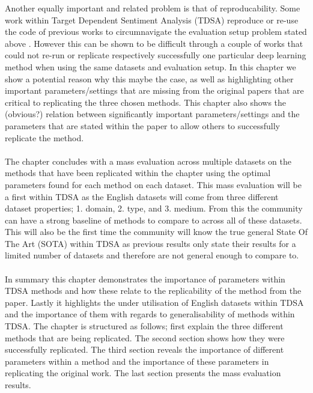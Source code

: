 Another equally important and related problem is that of reproducability. Some work within Target Dependent Sentiment Analysis (TDSA) reproduce or re-use the code of previous works to circumnavigate the evaluation setup problem stated above \citep{repro_chen_2017,repro_tay_2018}. However this can be shown to be difficult through a couple of works \citep{repro_chen_2017,repro_tay_2018} that could not re-run or replicate respectively successfully one particular deep learning method \citet{repro_tang_2016} when using the same datasets and evaluation setup. In this chapter we show a potential reason why this maybe the case, as well as highlighting other important parameters/settings that are missing from the original papers that are critical to replicating the three chosen methods. This chapter also shows the (obvious?) relation between significantly important parameters/settings and the parameters that are stated within the paper to allow others to successfully replicate the method.\\
\\
The chapter concludes with a mass evaluation across multiple datasets on the methods that have been replicated within the chapter using the optimal parameters found for each method on each dataset. This mass evaluation will be a first within TDSA as the English datasets will come from three different dataset properties; 1. domain, 2. type, and 3. medium. From this the community can have a strong baseline of methods to compare to across all of these datasets. This will also be the first time the community will know the true general State Of The Art (SOTA) within TDSA as previous results only state their results for a limited number of datasets and therefore are not general enough to compare to.\\
\\
In summary this chapter demonstrates the importance of parameters within TDSA methods and how these relate to the replicability of the method from the paper. Lastly it highlights the under utilisation of English datasets within TDSA and the importance of them with regards to generalisability of methods within TDSA. The chapter is structured as follows; first explain the three different methods that are being replicated. The second section shows how they were successfully replicated. The third section reveals the importance of different parameters within a method and the importance of these parameters in replicating the original work. The last section presents the mass evaluation results.

